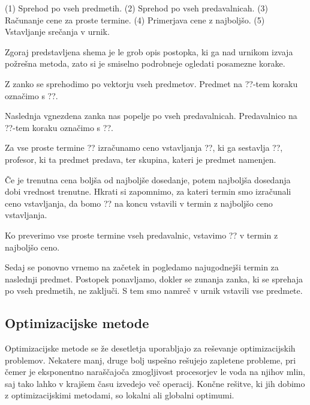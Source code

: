 \documentclass[a4paper,10pt]{article}
\begin{document}
   (1) Sprehod po vseh predmetih.
   {
      (2) Sprehod po vseh predavalnicah.
      {
         (3) Računanje cene za proste termine.
         (4) Primerjava cene z najboljšo.
      }
      (5) Vstavljanje srečanja v urnik.
   }
   
   Zgoraj predstavljena shema je le grob opis postopka, ki ga nad urnikom izvaja požrešna metoda,
   zato si je smiselno podrobneje ogledati posamezne korake.
   
      Z zanko se sprehodimo po vektorju vseh predmetov. Predmet na ??-tem koraku
      označimo s ??.
   
      Naslednja vgnezdena zanka nas popelje po vseh predavalnicah. Predavalnico na
      ??-tem koraku označimo s ??.
   
      Za vse proste termine ?? izračunamo ceno vstavljanja
      ??, ki ga sestavlja ??, profesor, ki ta predmet predava,
      ter skupina, kateri je predmet namenjen.
   
      Če je trenutna cena boljša od najboljše dosedanje, potem najboljša dosedanja
      dobi vrednost trenutne. Hkrati si zapomnimo, za kateri termin smo izračunali ceno
      vstavljanja, da bomo ?? na koncu vstavili v termin z najboljšo
      ceno vstavljanja.
   
      Ko preverimo vse proste termine vseh predavalnic, vstavimo ??
      v termin z najboljšo ceno.
   
      Sedaj se ponovno vrnemo na začetek in pogledamo najugodnejši termin za naslednji
      predmet. Postopek ponavljamo, dokler se zunanja zanka, ki se sprehaja po vseh predmetih,
      ne zaključi. S tem smo namreč v urnik vstavili vse predmete.
   
\subsection{   Optimizacijske metode}
   
   Optimizacijske metode se že desetletja uporabljajo za reševanje optimizacijskih problemov.
   Nekatere manj, druge bolj uspešno rešujejo zapletene probleme, pri čemer je eksponentno
   naraščajoča zmogljivost procesorjev le voda na njihov mlin, saj tako lahko v krajšem
   času izvedejo več operacij. Končne rešitve, ki jih dobimo z optimizacijskimi metodami,
   so lokalni ali globalni optimumi.
   
\end{document}
